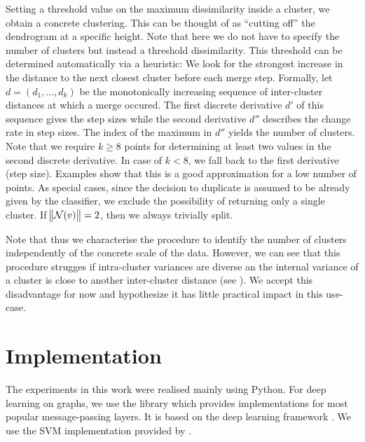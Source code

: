 \documentclass[
	fontsize=10pt, %
	twoside=false, %
	secnumdepth=1, %
  toc=indentunnumbered %
]{kaobook}
\begin{document}
Setting a threshold value on the maximum dissimilarity inside a cluster, we
obtain a concrete clustering. This can be thought of as ``cutting off'' the
dendrogram at a specific height. Note that here we do not have to specify the
number of clusters but instead a threshold dissimilarity. This threshold can be
determined automatically via a heuristic:
We look for the strongest increase in the distance to
the next closest cluster before each merge step. Formally, let $d = (d_1, ..., d_k)$
be the monotonically increasing sequence of inter-cluster distances at which a
merge occured. The first discrete derivative $d'$ of this sequence gives the step
sizes while the second derivative $d''$ describes the change rate in step sizes. The
index of the maximum in $d''$ yields the number of clusters.
Note that we require $k \geq 8$ points for determining at least two values in the second
discrete derivative. In case of $k < 8$, we fall back to the first derivative
(step size). Examples show that this is a good approximation for a low number of points.
%
As special cases, since the decision to duplicate is assumed to be already given
by the classifier, we exclude the possibility of returning only a single
cluster. If $\norm{\mathcal{N}(v)}=2$, then we always trivially split. 

Note that thus we characterise the procedure to identify the number of clusters
independently of the concrete scale of the data. However,
we can see that this procedure strugges if
intra-cluster variances are diverse an the internal variance of a
cluster is close to another inter-cluster distance (see ).
We accept this disadvantage
for now and hypothesize it has little practical impact in this use-case.



\section{Implementation}

The experiments in this work were realised mainly using Python. For deep
learning on graphs, we use the library 
\cite{fey_FastGraphRepresentation_2019}
which
provides implementations for most popular message-passing layers. It is based on
the deep learning framework 
\cite{paszke_PyTorchImperativeStyle_2019}. We use the SVM implementation
provided by 
\cite{pedregosa_ScikitlearnMachineLearning_}.
\end{document}

